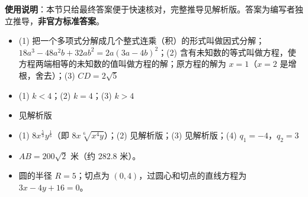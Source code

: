 
\begin{gknotice}
\textbf{使用说明}：本节只给最终答案便于快速核对，完整推导见解析版。答案为编写者独立推导，\textbf{非官方标准答案}。
\end{gknotice}

\begin{itemize}[leftmargin=2.6em]
  \item[\textbf{1.}] (1) 把一个多项式分解成几个整式连乘（积）的形式叫做因式分解；$18a^3-48a^2b+32ab^2=2a(3a-4b)^2$；(2) 含有未知数的等式叫做方程，使方程两端相等的未知数的值叫做方程的解；原方程的解为 $x=1$（$x=2$ 是增根，舍去）；(3) $CD=2\sqrt5$
  \item[\textbf{2.}] (1) $k<4$；(2) $k=4$；(3) $k>4$
  \item[\textbf{3.}] 见解析版
  \item[\textbf{4.}] (1) $8x^{\frac53}y^{\frac16}$（即 $8x\sqrt[6]{x^4y}$）；(2) 见解析版；(3) 见解析版；(4) $q_1=-4$，$q_2=3$
  \item[\textbf{5.}] $AB=200\sqrt2$ 米（约 $282.8$ 米）。
  \item[\textbf{6.}] 圆的半径 $R=5$；切点为 $(0,4)$，过圆心和切点的直线方程为 $3x-4y+16=0$。
\end{itemize}

